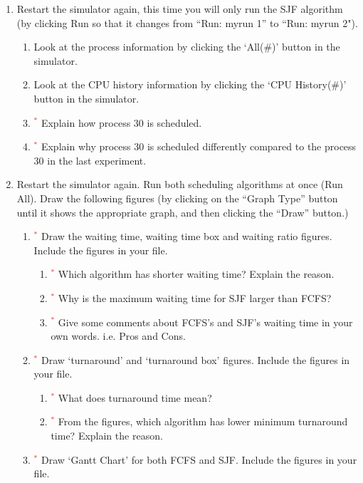 \documentclass[16pt]{article}
\begin{document}
\begin{enumerate}
\item Restart the simulator again, this time you will only run the SJF algorithm (by clicking
Run so that it changes from ``Run: myrun 1'' to ``Run: myrun 2").

\begin{enumerate}
\item Look at the process information by clicking the `All(\#)' button in the simulator.
\item Look at the CPU history information by clicking the `CPU History(\#)' button in the simulator.
\item \textcolor{red}{$^{*}$} Explain how process 30 is scheduled.
\item \textcolor{red}{$^{*}$} Explain why process 30 is scheduled differently compared to the process 30 in the last experiment.
\end{enumerate}

\item Restart the simulator again. Run both scheduling algorithms at once (Run All).
Draw the following figures (by clicking on the ``Graph Type'' button until it shows
the appropriate graph, and then clicking the ``Draw'' button.)

\begin{enumerate}
\item \textcolor{red}{$^{*}$} Draw the waiting time, waiting time box and waiting ratio figures. Include the figures in your file.
\begin{enumerate}
\item \textcolor{red}{$^{*}$} Which algorithm has shorter waiting time? Explain the reason.
\item \textcolor{red}{$^{*}$} Why is the maximum waiting time for SJF larger than FCFS?
\item \textcolor{red}{$^{*}$} Give some comments about FCFS's and SJF's waiting time in your own
words. i.e. Pros and Cons.
\end{enumerate}

\item \textcolor{red}{$^{*}$} Draw `turnaround' and `turnaround box' figures. Include the figures in your file.
\begin{enumerate}
\item \textcolor{red}{$^{*}$} What does turnaround time mean?
\item \textcolor{red}{$^{*}$} From the figures, which algorithm has lower minimum turnaround time? Explain the reason.
\end{enumerate}

\item \textcolor{red}{$^{*}$} Draw `Gantt Chart' for both FCFS and SJF. Include the figures in your file.
\end{enumerate}
\end{enumerate}
\end{document}
